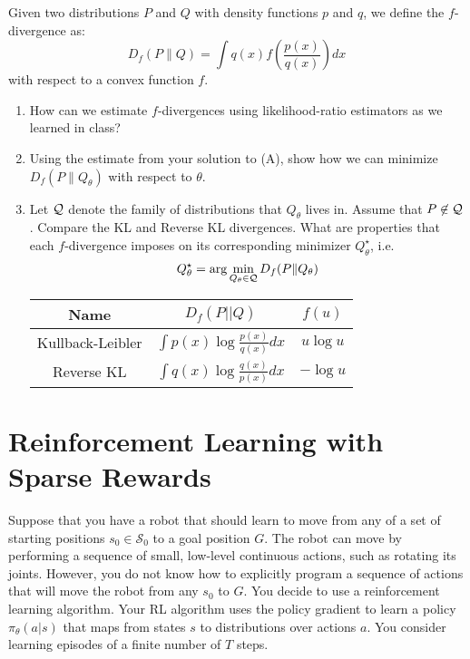 \documentclass[11pt]{article}
\begin{document}
Given two distributions $P$ and $Q$ with density functions $p$ and $q$, we define the $f$-divergence as:
\[
D_f(P\| Q) = \int q(x) f\left(\frac{p(x)}{q(x)}\right)dx
\]
with respect to a convex function $f$.

\begin{enumerate}[label=(\Alph*)]
    \item How can we estimate $f$-divergences using likelihood-ratio estimators as we learned in class?
    

    \item Using the estimate from your solution to (A), show how we can minimize $D_f(P\| Q_{\theta})$ with respect to $\theta$.
    
    
    \item Let ${\mathcal Q}$ denote the family of distributions that $Q_\theta$ lives in. Assume that $P \not\in {\mathcal Q}$. Compare the
    KL and Reverse KL divergences. What are properties that each $f$-divergence imposes on its corresponding minimizer $Q_\theta^\star$, i.e.\
    \[Q_\theta^\star = \arg\min_{Q_\theta\in {\mathcal Q}} D_f(P\| Q_\theta) \]

    \begin{table}[h]
    \begin{center}
        \begin{tabular}{ccc}
        \hline
          Name   &  $D_f(P||Q)$ & $f(u)$\\ \hline
         Kullback-Leibler    & $\int p(x) \log \frac{p(x)}{q(x)} dx$ & $u \log u$ \\
         Reverse KL & $\int q(x) \log \frac{q(x)}{p(x)} dx$ & $-\log u$ \\
         \end{tabular}
    \end{center}
    \end{table}

\end{enumerate}

\newpage

\section{Reinforcement Learning with Sparse Rewards}

\noindent Suppose that you have a robot that should learn to move from any of a set of starting positions $s_0 \in \mathcal{S}_0$ to a goal position $G$. The robot can move by performing a sequence of small, low-level continuous actions, such as rotating its joints. However, you do not know how to explicitly program a sequence of actions that will move the robot from any $s_0$ to $G$. You decide to use a reinforcement learning algorithm. Your RL algorithm uses the policy gradient to learn a policy $\pi_\theta(a|s)$ that maps from states $s$ to distributions over actions $a$. You consider learning episodes of a finite number of $T$ steps.
\end{document}
